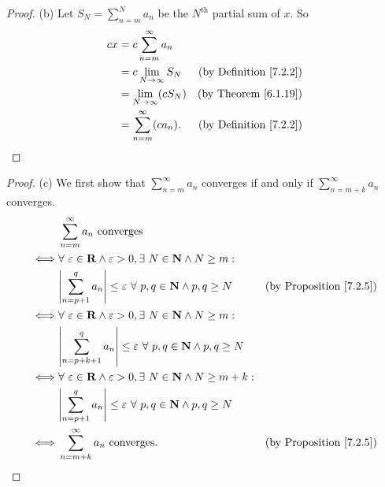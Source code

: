 \begin{proof}{(b)}
    Let \(S_N = \sum_{n = m}^N a_n\) be the \(N^{\text{th}}\) partial sum of \(x\).
    So
    \begin{align*}
        cx & = c \sum_{n = m}^\infty a_n                                         \\
           & = c \lim_{N \to \infty} S_N    & \text{(by Definition \ref{7.2.2})} \\
           & = \lim_{N \to \infty} (c S_N)  & \text{(by Theorem \ref{6.1.19})}   \\
           & = \sum_{n = m}^\infty (c a_n). & \text{(by Definition \ref{7.2.2})}
    \end{align*}
\end{proof}

\begin{proof}{(c)}
    We first show that \(\sum_{n = m}^\infty a_n\) converges if and only if \(\sum_{n = m + k}^\infty a_n\) converges.
    \begin{align*}
             & \sum_{n = m}^\infty a_n \text{ converges}                                                                                                       \\
        \iff & \forall\ \varepsilon \in \mathbf{R} \land \varepsilon > 0, \exists\ N \in \mathbf{N} \land N \geq m :                                           \\
             & \abs*{\sum_{n = p + 1}^q a_n} \leq \varepsilon \ \forall\ p, q \in \mathbf{N} \land p, q \geq N           & \text{(by Proposition \ref{7.2.5})} \\
        \iff & \forall\ \varepsilon \in \mathbf{R} \land \varepsilon > 0, \exists\ N \in \mathbf{N} \land N \geq m :                                           \\
             & \abs*{\sum_{n = p + k + 1}^q a_n} \leq \varepsilon \ \forall\ p, q \in \mathbf{N} \land p, q \geq N                                             \\
        \iff & \forall\ \varepsilon \in \mathbf{R} \land \varepsilon > 0, \exists\ N \in \mathbf{N} \land N \geq m + k :                                       \\
             & \abs*{\sum_{n = p + 1}^q a_n} \leq \varepsilon \ \forall\ p, q \in \mathbf{N} \land p, q \geq N                                                 \\
        \iff & \sum_{n = m + k}^\infty a_n \text{ converges}.                                                            & \text{(by Proposition \ref{7.2.5})}
    \end{align*}


\end{proof}
